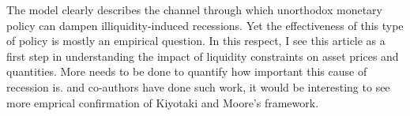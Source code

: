 \documentclass{amsart}
\theoremstyle{definition}
\theoremstyle{remark}
\numberwithin{equation}{section}
\begin{document}
The model clearly describes the channel through which unorthodox monetary policy can dampen illiquidity-induced recessions. Yet the effectiveness of this type of policy is mostly an empirical question. In this respect, I see this article as a first step in understanding the impact of liquidity constraints on asset prices and quantities. More needs to be done to quantify how important this cause of recession is. \cite{del2017great} and co-authors have done such work, it would be interesting to see more emprical confirmation of Kiyotaki and Moore's framework. \\




\end{document}
